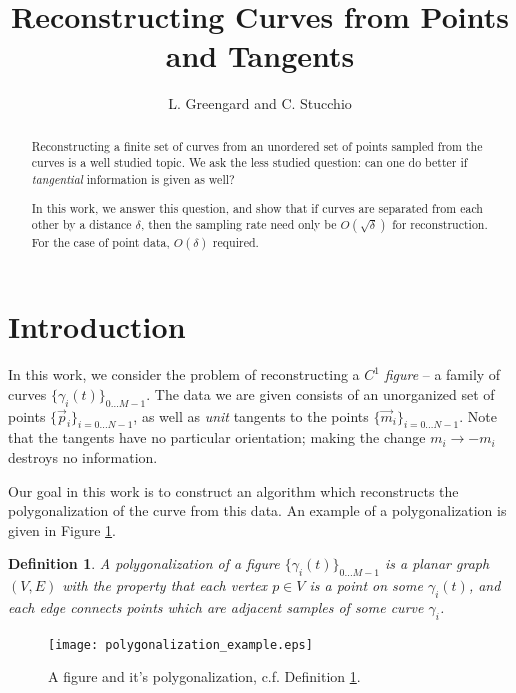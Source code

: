 \documentclass{article}
\newtheorem{definition}[cntr]{Definition}
\numberwithin{cntr}{section}
\numberwithin{equation}{section}
\newcommand{\vp}[0]{{\vec{p}}}
\newcommand{\vm}[0]{{\vec{m}}}
\newcommand{\Oto}[1]{{0 \ldots #1-1}}
\newcommand{\OtoN}{{0 \ldots N-1}}
\newcommand{\pointData}{{ \{ \vp_{i} \}_{i=\OtoN} }}
\newcommand{\tanData}{{ \{ \vm_{i} \}_{i=\OtoN} }}
\newcommand{\curveSet}{{ \{ \gamma_i(t) \}_{\Oto{M}}}}
\newcommand{\curvesep}{{\delta}}
\begin{document}
\title{Reconstructing Curves from Points and Tangents}

\author{L. Greengard and C. Stucchio}

\maketitle

\begin{abstract}
  Reconstructing a finite set of curves from an unordered set of points sampled from the curves is a well studied topic. We ask the less studied question: can one do better if \emph{tangential} information is given as well?

  In this work, we answer this question, and show that if curves are separated from each other by a distance $\curvesep$, then the sampling rate need only be $O(\sqrt{\curvesep})$ for reconstruction. For the case of point data, $O(\curvesep)$ required.
\end{abstract}

\section{Introduction}

In this work, we consider the problem of reconstructing a $C^{1}$ \emph{figure} -- a family of curves $\curveSet$. The data we are given consists of an unorganized set of points $\pointData$, as well as \emph{unit} tangents to the points $\tanData$. Note that the tangents have no particular orientation; making the change $m_{i} \rightarrow -m_{i}$ destroys no information.

Our goal in this work is to construct an algorithm which reconstructs the polygonalization of the curve from this data. An example of a polygonalization is given in Figure \ref{fig:polygonalization}.

\begin{definition}
  \label{def:polygonalization}
  A polygonalization of a figure $\curveSet$ is a planar graph $(V,E)$ with the property that each vertex $p \in V$ is a point on some $\gamma_{i}(t)$, and each edge connects points which are adjacent samples of some curve $\gamma_{i}$.
\end{definition}

\begin{figure}
\setlength{\unitlength}{0.240900pt}
\ifx\plotpoint\undefined\newsavebox{\plotpoint}\fi
\sbox{\plotpoint}{\rule[-0.200pt]{0.400pt}{0.400pt}}%
\texttt{[image: polygonalization\_example.eps]}

\caption{A figure and it's polygonalization, c.f. Definition \ref{def:polygonalization}. }
\label{fig:polygonalization}
\end{figure}
\end{document}
